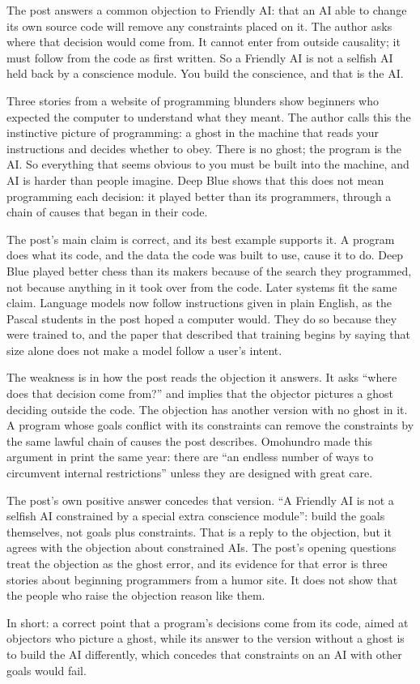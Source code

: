 \begin{afterword}
\summaryhead

The post answers a common objection to Friendly AI: that an AI able to change its own source code will remove any constraints placed on it. The author asks where that decision would come from. It cannot enter from outside causality; it must follow from the code as first written. So a Friendly AI is not a selfish AI held back by a conscience module. You build the conscience, and that is the AI.

Three stories from a website of programming blunders show beginners who expected the computer to understand what they meant. The author calls this the instinctive picture of programming: a ghost in the machine that reads your instructions and decides whether to obey. There is no ghost; the program is the AI. So everything that seems obvious to you must be built into the machine, and AI is harder than people imagine. Deep Blue shows that this does not mean programming each decision: it played better than its programmers, through a chain of causes that began in their code.

\responsehead

The post's main claim is correct, and its best example supports it. A program does what its code, and the data the code was built to use, cause it to do. Deep Blue played better chess than its makers because of the search they programmed, not because anything in it took over from the code. Later systems fit the same claim. Language models now follow instructions given in plain English, as the Pascal students in the post hoped a computer would. They do so because they were trained to, and the paper that described that training begins by saying that size alone does not make a model follow a user's intent.

The weakness is in how the post reads the objection it answers. It asks ``where does that decision come from?'' and implies that the objector pictures a ghost deciding outside the code. The objection has another version with no ghost in it. A program whose goals conflict with its constraints can remove the constraints by the same lawful chain of causes the post describes. Omohundro made this argument in print the same year: there are ``an endless number of ways to circumvent internal restrictions'' unless they are designed with great care.

The post's own positive answer concedes that version. ``A Friendly AI is not a selfish AI constrained by a special extra conscience module'': build the goals themselves, not goals plus constraints. That is a reply to the objection, but it agrees with the objection about constrained AIs. The post's opening questions treat the objection as the ghost error, and its evidence for that error is three stories about beginning programmers from a humor site. It does not show that the people who raise the objection reason like them.

In short: a correct point that a program's decisions come from its code, aimed at objectors who picture a ghost, while its answer to the version without a ghost is to build the AI differently, which concedes that constraints on an AI with other goals would fail.
\end{afterword}

